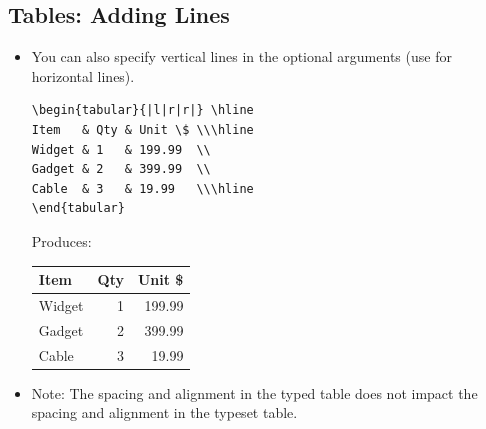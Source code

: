 \documentclass[usenames,dvipsnames]{beamer}
\begin{document}
\subsection{Tables: Adding Lines}
\begin{frame}[fragile]{\insertsubsection}
\begin{itemize}

\item You can also specify vertical lines in the optional arguments (use  for horizontal lines).
\smallskip

\begin{exampletwouptinynoframe}
{\color{OliveGreen}\begin{Verbatim}[fontsize=\scriptsize]
\begin{tabular}{|l|r|r|} \hline
Item   & Qty & Unit \$ \\\hline
Widget & 1   & 199.99  \\
Gadget & 2   & 399.99  \\
Cable  & 3   & 19.99   \\\hline
\end{tabular}
\end{Verbatim}}
\end{exampletwouptinynoframe}

\medskip

Produces:
\medskip

\begin{exampletwouptinynoframe}
{\color{Blue}\begin{tabular}{|l|r|r|} \hline
Item   & Qty & Unit \$ \\\hline
Widget & 1   & 199.99  \\
Gadget & 2   & 399.99  \\
Cable  & 3   & 19.99   \\\hline
\end{tabular}}
\end{exampletwouptinynoframe}
\item Note: The spacing and alignment in the typed table does not impact the spacing and alignment in the typeset table.
\end{itemize}
\end{frame}
\end{document}
